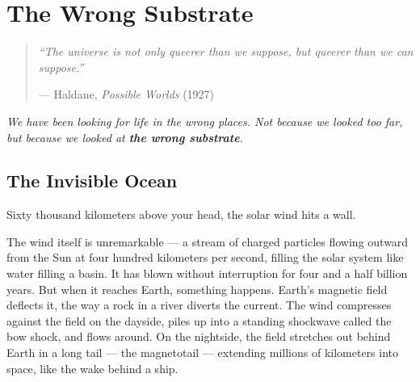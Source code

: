 
\chapter{The Wrong Substrate}
\label{spine:wrong-substrate}

\begin{quote}\small\textit{%
``The universe is not only queerer than we suppose, but queerer than we can suppose.''%
}\par\raggedleft --- Haldane, \textit{Possible Worlds} (1927)\end{quote}

\vspace{0.5cm}


\noindent\textit{We have been looking for life in the wrong places. Not because we looked too far, but because we looked at \textbf{the wrong substrate}.}


\section*{The Invisible Ocean}
\label{spine:ws-the-invisible-ocean}

Sixty thousand kilometers above your head, the solar wind hits a wall.

The wind itself is unremarkable --- a stream of charged particles flowing outward from the Sun at four hundred kilometers per second, filling the solar system like water filling a basin. It has blown without interruption for four and a half billion years. But when it reaches Earth, something happens. Earth's magnetic field deflects it, the way a rock in a river diverts the current. The wind compresses against the field on the dayside, piles up into a standing shockwave called the bow shock, and flows around. On the nightside, the field stretches out behind Earth in a long tail --- the magnetotail --- extending millions of kilometers into space, like the wake behind a ship.

